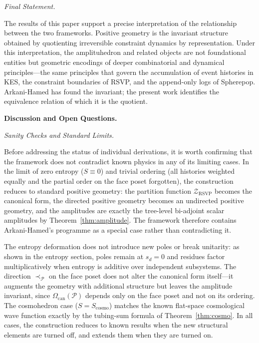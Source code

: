 \documentclass[11pt]{article}
\theoremstyle{plain}
\theoremstyle{definition}
\theoremstyle{remark}
\newcommand{\Sf}{S}
\newcommand{\CF}{\Omega_{\mathrm{can}}}
\newcommand{\ZRSVP}{\mathcal{Z}_{\mathrm{RSVP}}}
\begin{document}
\medskip\noindent\textit{Final Statement.}

The results of this paper support a precise interpretation of the relationship between the two frameworks. Positive geometry is the invariant structure obtained by quotienting irreversible constraint dynamics by representation. Under this interpretation, the amplituhedron and related objects are not foundational entities but geometric encodings of deeper combinatorial and dynamical principles---the same principles that govern the accumulation of event histories in KES, the constraint boundaries of RSVP, and the append-only logs of Spherepop. Arkani-Hamed has found the invariant; the present work identifies the equivalence relation of which it is the quotient.

\bigskip\noindent\textbf{Discussion and Open Questions.}
\label{sec:discussion}

\medskip\noindent\textit{Sanity Checks and Standard Limits.}

Before addressing the status of individual derivations, it is worth confirming that the framework does not contradict known physics in any of its limiting cases. In the limit of zero entropy ($\Sf \equiv 0$) and trivial ordering (all histories weighted equally and the partial order on the face poset forgotten), the construction reduces to standard positive geometry: the partition function $\ZRSVP$ becomes the canonical form, the directed positive geometry becomes an undirected positive geometry, and the amplitudes are exactly the tree-level bi-adjoint scalar amplitudes by Theorem~\ref{thm:amplitude}. The framework therefore contains Arkani-Hamed's programme as a special case rather than contradicting it.

The entropy deformation does not introduce new poles or break unitarity: as shown in the entropy section, poles remain at $s_d = 0$ and residues factor multiplicatively when entropy is additive over independent subsystems. The direction $\prec_{\mathcal{P}}$ on the face poset does not alter the canonical form itself---it augments the geometry with additional structure but leaves the amplitude invariant, since $\CF(\mathcal{P})$ depends only on the face poset and not on its ordering. The cosmohedron case ($\Sf = \Sf_{\mathrm{cosmo}}$) matches the known flat-space cosmological wave function exactly by the tubing-sum formula of Theorem~\ref{thm:cosmo}. In all cases, the construction reduces to known results when the new structural elements are turned off, and extends them when they are turned on.
\end{document}
